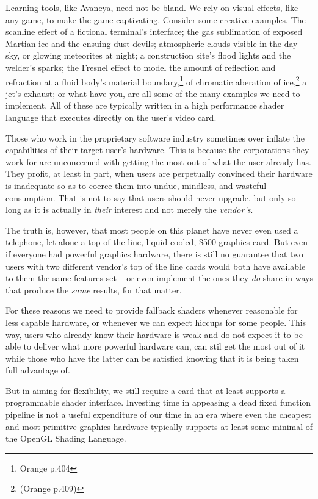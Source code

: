 Learning tools, like Avaneya, need not be bland. We rely on visual effects, like any game, to make the game captivating. Consider some creative examples. The scanline effect of a fictional terminal's interface; the gas sublimation of exposed Martian ice and the ensuing dust devils; atmospheric  clouds visible in the day sky, or glowing meteorites at night; a construction site's flood lights and the welder's sparks; the Fresnel effect to model the amount of reflection and refraction at a fluid body's material boundary,\footnote{Orange p.404} of chromatic aberation of ice,\footnote{(Orange p.409)} a jet's exhaust; or what have you, are all some of the many examples we need to implement. All of these are typically written in a high performance shader language that executes directly on the user's video card.

Those who work in the proprietary software industry sometimes over inflate the capabilities of their target user's hardware. This is because the corporations they work for are unconcerned with getting the most out of what the user already has. They profit, at least in part, when users are perpetually convinced their hardware is inadequate so as to coerce them into undue, mindless, and wasteful consumption. That is not to say that users should never upgrade, but only so long as it is actually in {\it their} interest and not merely the {\it vendor's}.

The truth is, however, that most people on this planet have never even used a telephone, let alone a top of the line, liquid cooled, \$500 graphics card. But even if everyone had powerful graphics hardware, there is still no guarantee that two users with two different vendor's top of the line cards would both have available to them the same features set -- or even implement the ones they {\it do} share in ways that produce the {\it same} results, for that matter. 

For these reasons we need to provide fallback shaders whenever reasonable for less capable hardware, or whenever we can expect hiccups for some people. This way, users who already know their hardware is weak and do not expect it to be able to deliver what more powerful hardware can, can stil get the most out of it while those who have the latter can be satisfied knowing that it is being taken full advantage of.

But in aiming for flexibility, we still require a card that at least supports a programmable shader interface. Investing time in appeasing a dead fixed function pipeline is not a useful expenditure of our time in an era where even the cheapest and most primitive graphics hardware typically supports at least some minimal of the OpenGL Shading Language.

